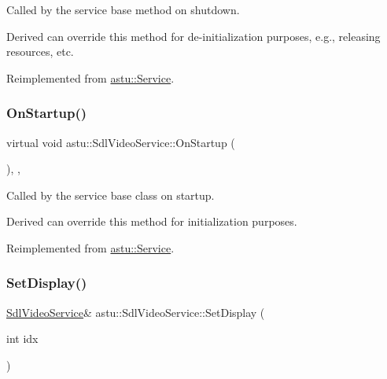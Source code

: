 Called by the service base method on shutdown.

Derived can override this method for de-\/initialization purposes, e.\+g., releasing resources, etc. 

Reimplemented from \hyperlink{classastu_1_1Service_a1e1dff727df791c57fae782d8a613c5f}{astu\+::\+Service}.

\mbox{\label{classastu_1_1SdlVideoService_add229ac2af59a4aea090e4de4c67e530}} 
\subsubsection{\texorpdfstring{On\+Startup()}{OnStartup()}}
{\footnotesize\ttfamily virtual void astu\+::\+Sdl\+Video\+Service\+::\+On\+Startup (\begin{DoxyParamCaption}{ }\end{DoxyParamCaption})\hspace{0.3cm}{\ttfamily [override]}, {\ttfamily [protected]}, {\ttfamily [virtual]}}

Called by the service base class on startup.

Derived can override this method for initialization purposes. 

Reimplemented from \hyperlink{classastu_1_1Service_a357dc663e000b1f086f681ec3c459bfe}{astu\+::\+Service}.

\mbox{\label{classastu_1_1SdlVideoService_a46fe8816a8975a2d6cd7311bdbd46167}} 
\subsubsection{\texorpdfstring{Set\+Display()}{SetDisplay()}}
{\footnotesize\ttfamily \hyperlink{classastu_1_1SdlVideoService}{Sdl\+Video\+Service}\& astu\+::\+Sdl\+Video\+Service\+::\+Set\+Display (\begin{DoxyParamCaption}\item[{int}]{idx }\end{DoxyParamCaption})}

